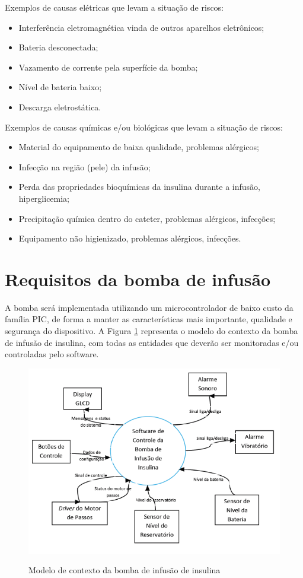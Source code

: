 Exemplos de causas elétricas que levam a situação de riscos:
\begin{itemize}
\item Interferência eletromagnética vinda de outros aparelhos eletrônicos;
\item Bateria desconectada;
\item Vazamento de corrente pela superfície da bomba;
\item Nível de bateria baixo;
\item Descarga eletrostática.
\end{itemize}

Exemplos de causas químicas e/ou biológicas que levam a situação de riscos:
\begin{itemize}
\item Material do equipamento de baixa qualidade, problemas alérgicos;
\item Infecção na região (pele) da infusão;
\item Perda das propriedades bioquímicas da insulina durante a infusão, hiperglicemia;
\item Precipitação química dentro do cateter, problemas alérgicos, infecções;
\item Equipamento não higienizado, problemas alérgicos, infecções.
\end{itemize}

\section{Requisitos da bomba de infusão}

A bomba será implementada utilizando um microcontrolador de baixo custo da família PIC, de forma a manter as características mais importante, qualidade e segurança do dispositivo. A Figura \ref{fig:contextobomba} representa o modelo do contexto da bomba de infusão de insulina, com todas as entidades que deverão ser monitoradas e/ou controladas pelo software.

\begin{figure}[htp]
	\centering
	\includegraphics[scale=1]{images/contexto_bomba.png}
	\caption{Modelo de contexto da bomba de infusão de insulina}	
	\label{fig:contextobomba}
	\cite{galvao2013requirements}
\end{figure}


